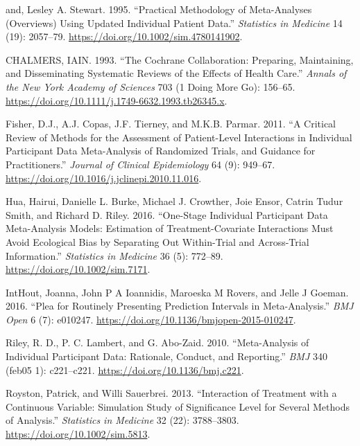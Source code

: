 \documentclass[]{article}
\begin{document}
\hypertarget{refs}{}
\leavevmode\hypertarget{ref-Stewart_1995}{}%
and, Lesley A. Stewart. 1995. ``Practical Methodology of Meta-Analyses
(Overviews) Using Updated Individual Patient Data.'' \emph{Statistics in
Medicine} 14 (19): 2057--79.
\url{https://doi.org/10.1002/sim.4780141902}.

\leavevmode\hypertarget{ref-CHALMERS_1993}{}%
CHALMERS, IAIN. 1993. ``The Cochrane Collaboration: Preparing,
Maintaining, and Disseminating Systematic Reviews of the Effects of
Health Care.'' \emph{Annals of the New York Academy of Sciences} 703 (1
Doing More Go): 156--65.
\url{https://doi.org/10.1111/j.1749-6632.1993.tb26345.x}.

\leavevmode\hypertarget{ref-Fisher_2011}{}%
Fisher, D.J., A.J. Copas, J.F. Tierney, and M.K.B. Parmar. 2011. ``A
Critical Review of Methods for the Assessment of Patient-Level
Interactions in Individual Participant Data Meta-Analysis of Randomized
Trials, and Guidance for Practitioners.'' \emph{Journal of Clinical
Epidemiology} 64 (9): 949--67.
\url{https://doi.org/10.1016/j.jclinepi.2010.11.016}.

\leavevmode\hypertarget{ref-Hua_2016}{}%
Hua, Hairui, Danielle L. Burke, Michael J. Crowther, Joie Ensor, Catrin
Tudur Smith, and Richard D. Riley. 2016. ``One-Stage Individual
Participant Data Meta-Analysis Models: Estimation of Treatment-Covariate
Interactions Must Avoid Ecological Bias by Separating Out Within-Trial
and Across-Trial Information.'' \emph{Statistics in Medicine} 36 (5):
772--89. \url{https://doi.org/10.1002/sim.7171}.

\leavevmode\hypertarget{ref-IntHout_2016}{}%
IntHout, Joanna, John P A Ioannidis, Maroeska M Rovers, and Jelle J
Goeman. 2016. ``Plea for Routinely Presenting Prediction Intervals in
Meta-Analysis.'' \emph{BMJ Open} 6 (7): e010247.
\url{https://doi.org/10.1136/bmjopen-2015-010247}.

\leavevmode\hypertarget{ref-Riley_2010}{}%
Riley, R. D., P. C. Lambert, and G. Abo-Zaid. 2010. ``Meta-Analysis of
Individual Participant Data: Rationale, Conduct, and Reporting.''
\emph{BMJ} 340 (feb05 1): c221--c221.
\url{https://doi.org/10.1136/bmj.c221}.

\leavevmode\hypertarget{ref-royston_interaction_2013}{}%
Royston, Patrick, and Willi Sauerbrei. 2013. ``Interaction of Treatment
with a Continuous Variable: Simulation Study of Significance Level for
Several Methods of Analysis.'' \emph{Statistics in Medicine} 32 (22):
3788--3803. \url{https://doi.org/10.1002/sim.5813}.
\end{document}
